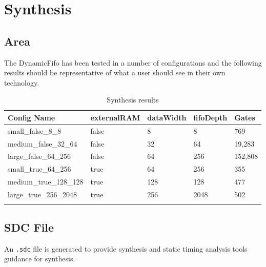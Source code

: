 \documentclass{article}
\begin{document}
\section{Synthesis}

\subsection{Area}

The DynamicFifo has been tested in a number of configurations and the following
results should be representative of what a user should see in their own
technology.

\renewcommand*{\arraystretch}{1.4}
\begin{longtable}[H]{
    | p{}
    | p{}
    | p{}
    | p{}
    | p{} |
  }
  \hline
  \textbf{Config Name}   &
  \textbf{externalRAM}   &
  \textbf{dataWidth}     &
  \textbf{fifoDepth}     &
  \textbf{Gates}           \\ \hline \hline

  small\_false\_8\_8     &
  false                  &
  8                      &
  8                      &
  769                      \\ \hline

  medium\_false\_32\_64  &
  false                  &
  32                     &
  64                     &
  19,283                   \\ \hline

  large\_false\_64\_256  &
  false                  &
  64                     &
  256                    &
  152,808                  \\ \hline

  small\_true\_64\_256   &
  true                   &
  64                     &
  256                    &
  355                      \\ \hline

  medium\_true\_128\_128 &
  true                   &
  128                    &
  128                    &
  477                      \\ \hline

  large\_true\_256\_2048 &
  true                   &
  256                    &
  2048                   &
  502                      \\ \hline
  \caption{Synthesis results}\label{table:area}
\end{longtable}

\subsection{SDC File}
An \texttt{.sdc} file is generated to provide synthesis and static timing
analysis tools guidance for synthesis.
\end{document}
